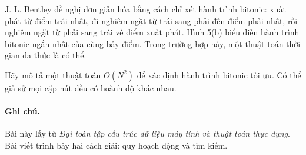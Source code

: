 \documentclass[11pt]{article}
\begin{document}
J. L. Bentley đề nghị đơn giản hóa bằng cách chỉ xét hành trình bitonic:
xuất phát từ điểm trái nhất, đi nghiêm ngặt từ trái sang phải đến điểm phải
nhất, rồi nghiêm ngặt từ phải sang trái về điểm xuất phát. Hình 5(b) biểu
diễn hành trình bitonic ngắn nhất của cùng bảy điểm. Trong trường hợp này,
một thuật toán thời gian đa thức là có thể.

Hãy mô tả một thuật toán \(O(N^2)\) để xác định hành trình bitonic tối ưu. Có
thể giả sử mọi cặp nút đều có hoành độ khác nhau.

\paragraph{Ghi chú.}
Bài này lấy từ \textit{Đại toàn tập cấu trúc dữ liệu máy tính và thuật toán
thực dụng}. Bài viết trình bày hai cách giải: quy hoạch động và tìm kiếm.
\end{document}
